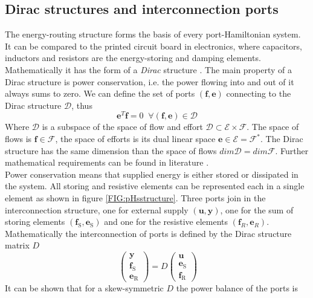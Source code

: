 \documentclass[a4paper,twoside, openright,12pt]{report}
\newcommand{\f}[1]{\boldsymbol{#1}}
\newcommand{\g}[1]{\text{#1}}
\begin{document}
\subsection{Dirac structures and interconnection ports} \label{SS:PHSinterconnection}
The energy-routing structure forms the basis of every port-Hamiltonian system. It can be compared to the printed circuit board in electronics, where capacitors, inductors and resistors are the energy-storing and damping elements. Mathematically it has the form of a \emph{Dirac} structure \cite{vanderSchaft_06}. The main property of a Dirac structure is power conservation, i.e. the power flowing into and out of it always sums to zero. We can define the set of ports $(\f{f},\f{e})$ connecting to the Dirac structure $\mathcal{D}$, thus 
\begin{equation}
\f{e}^T\f{f} = 0 \;  \; \forall (\f{f},\f{e})\in\mathcal{D}
\end{equation}
Where $\mathcal{D}$ is a subspace of the space of flow and effort $\mathcal{D} \subset \mathcal{E}\times \mathcal{F}$. The space of flows is $\f{f} \in \mathcal{F}$, the space of efforts is its dual linear space $\f{e} \in \mathcal{E} = \mathcal{F}^*$. The Dirac structure has the same dimension than the space of flows $dim \mathcal{D} = dim \mathcal{F}$.
Further mathematical requirements can be found in literature \cite{vanderSchaft_06,Schaft_14}.\\
 Power conservation means that supplied energy is either stored or dissipated in the system. All storing and resistive elements can be represented each in a single element as shown in figure \ref{FIG:pHsstructure}. Three ports join in the interconnection structure, one for external supply $(\f{u},\f{y})$, one for the sum of storing elements $(\f{f}_\g{S},\f{e}_\g{S})$ and one for the resistive elements $(\f{f}_R,\f{e}_R)$. Mathematically the  interconnection of ports is defined by the Dirac structure matrix $D$
\begin{equation}\
\begin{pmatrix}
\f{y} \\ \f{f}_\g{S} \\ \f{e}_\g{R}
\end{pmatrix} = D \begin{pmatrix}
\f{u} \\ \f{e}_\g{S} \\ \f{f}_\g{R}
\end{pmatrix}
\end{equation}
It can be shown that for a skew-symmetric $D$ the power balance of the ports is
\end{document}
